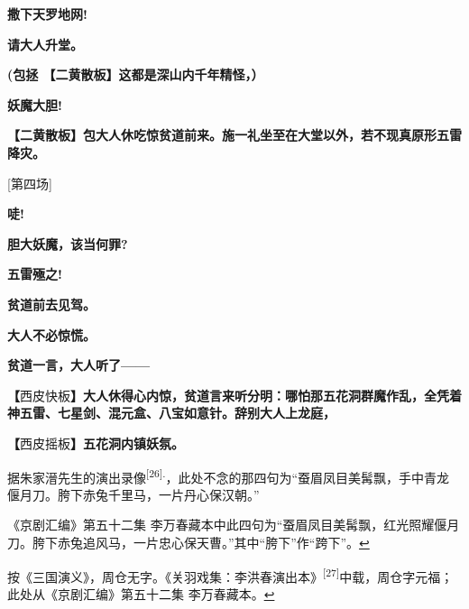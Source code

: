 \textbf{撒下天罗地网!}

\textbf{请大人升堂。}

\textbf{(包拯 【二黄散板】这都是深山内千年精怪，）}

\textbf{妖魔大胆!}

\textbf{【二黄散板】包大人休吃惊贫道前来。施一礼坐至在大堂以外，若不现真原形五雷降灾。}

{[}第四场{]}

\textbf{唗!}

\textbf{胆大妖魔，该当何罪?}

\textbf{五雷殛之!}

\textbf{贫道前去见驾。}

\textbf{大人不必惊慌。}

\textbf{贫道一言，大人听了------}

\textbf{【}西皮快板\textbf{】大人休得心内惊，贫道言来听分明：哪怕那五花洞群魔作乱，全凭着神五雷、七星剑、混元盒、八宝如意针。辞别大人上龙庭，}

\textbf{【}西皮摇板\textbf{】五花洞内镇妖氛。}

\item
  \leavevmode\hypertarget{fn629}{}%
  据朱家溍先生的演出录像\textsuperscript{{[}26{]}.}，此处不念的那四句为``蚕眉凤目美髯飘，手中青龙偃月刀。胯下赤兔千里马，一片丹心保汉朝。''

  《京剧汇编》第五十二集
  李万春藏本中此四句为``蚕眉凤目美髯飘，红光照耀偃月刀。胯下赤兔追风马，一片忠心保天曹。''其中``胯下''作``跨下''。\protect\hyperlink{fnref629}{↩}
\item
  \leavevmode\hypertarget{fn630}{}%
  按《三国演义》，周仓无字。《关羽戏集：李洪春演出本》\textsuperscript{{[}27{]}}中载，周仓字元福；此处从《京剧汇编》第五十二集
  李万春藏本。\protect\hyperlink{fnref630}{↩}
